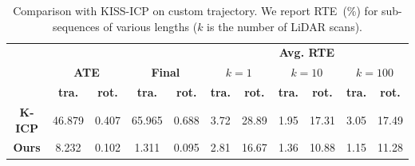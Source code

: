 \begin{table}[h]
    \centering
    \begin{tabular}{c|cc|cc|cc|cc|cc}
        \hline
                       &                                    &                                     &                            &                             & \multicolumn{6}{c}{\textbf{Avg. RTE}}                                                                                 \\
                       & \multicolumn{2}{c|}{ \textbf{ATE}} & \multicolumn{2}{c|}{\textbf{Final}} & \multicolumn{2}{c|}{$k=1$} & \multicolumn{2}{c|}{$k=10$} & \multicolumn{2}{c}{$k=100$}                                                                                           \\
                       & \textbf{tra.}                      & \textbf{rot.}                       & \textbf{tra.}              & \textbf{rot.}               & \textbf{tra.}                         & \textbf{rot.} & \textbf{tra.} & \textbf{rot.} & \textbf{tra.} & \textbf{rot.} \\
        \hline
        \hline
        \textbf{K-ICP} & 46.879                             & 0.407                               & 65.965                     & 0.688                       & 3.72                                  & 28.89         & 1.95          & 17.31         & 3.05          & 17.49         \\
        \textbf{Ours}  & 8.232                              & 0.102                               & 1.311                      & 0.095                       & 2.81                                  & 16.67         & 1.36          & 10.88         & 1.15          & 11.28         \\
        \hline
    \end{tabular}
    \caption{Comparison with KISS-ICP \cite{vizzo2023ral} on custom trajectory. We report RTE~(\%) for sub-sequences of various lengths ($k$ is the number of LiDAR scans). }
    \label{tab:custom-traj-results}
\end{table}

